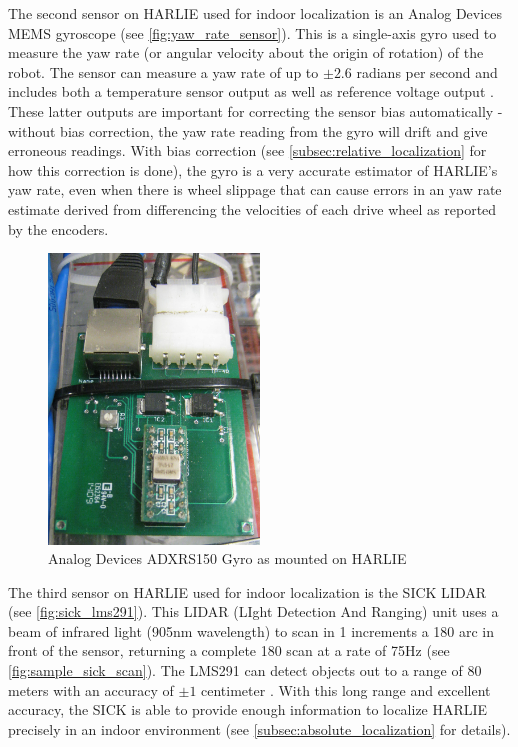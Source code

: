 The second sensor on HARLIE used for indoor localization is an Analog Devices MEMS gyroscope (see \autoref{fig:yaw_rate_sensor}). This is a single-axis gyro used to measure the yaw rate (or angular velocity about the origin of rotation) of the robot. The sensor can measure a yaw rate of up to $\pm2.6$ radians per second and includes both a temperature sensor output as well as reference voltage output \autocite{ADXRS150Datasheet}. These latter outputs are important for correcting the sensor bias automatically - without bias correction, the yaw rate reading from the gyro will drift and give erroneous readings. With bias correction (see \autoref{subsec:relative_localization} for how this correction is done), the gyro is a very accurate estimator of HARLIE's yaw rate, even when there is wheel slippage that can cause errors in an yaw rate estimate derived from differencing the velocities of each drive wheel as reported by the encoders.

\begin{figure}
\centering
\includegraphics[width=0.5\textwidth]{images/yaw_rate_sensor}
\caption{Analog Devices ADXRS150 Gyro as mounted on HARLIE \label{fig:yaw_rate_sensor}}
\end{figure}

The third sensor on HARLIE used for indoor localization is the SICK LIDAR (see \autoref{fig:sick_lms291}). This LIDAR (LIght Detection And Ranging) unit uses a beam of infrared light (905nm wavelength) to scan in 1\degree{} increments a 180\degree{} arc in front of the sensor, returning a complete 180\degree{} scan at a rate of 75Hz (see \autoref{fig:sample_sick_scan}). The LMS291 can detect objects out to a range of 80 meters with an accuracy of $\pm1$ centimeter \autocite{SICKLMS291Datasheet}. With this long range and excellent accuracy, the SICK is able to provide enough information to localize HARLIE precisely in an indoor environment (see \autoref{subsec:absolute_localization} for details). 

